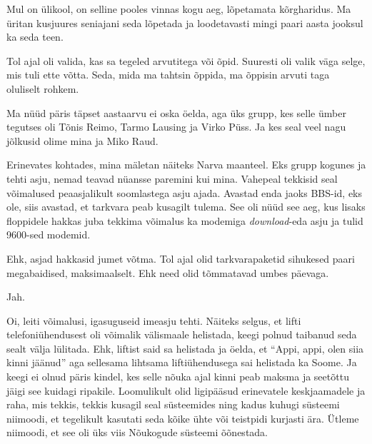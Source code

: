 
Mul on ülikool, on selline pooles vinnas kogu aeg, lõpetamata kõrgharidus. Ma 
üritan kusjuures seniajani seda lõpetada ja loodetavasti mingi paari aasta 
jooksul ka seda teen.

Tol ajal oli valida, kas sa tegeled arvutitega või õpid. Suuresti oli valik 
väga selge, mis tuli ette võtta. Seda, mida ma tahtsin õppida, ma õppisin 
arvuti taga oluliselt rohkem.
                 

Ma nüüd päris täpset aastaarvu ei oska öelda, aga üks grupp, kes selle ümber  
tegutses oli Tõnis Reimo, Tarmo 
Lausing ja Virko Püss. Ja 
kes seal  veel nagu jõlkusid olime mina ja Miko Raud.  


Erinevates kohtades, mina mäletan näiteks Narva maanteel. Eks grupp kogunes ja 
tehti asju, nemad teavad nüansse paremini kui mina. Vahepeal tekkisid seal 
võimalused  peaasjalikult soomlastega asju ajada. Avastad enda jaoks BBS-id, 
eks ole, siis avastad, et tarkvara peab kusagilt tulema. See oli nüüd see aeg, 
kus lisaks floppidele hakkas juba tekkima võimalus ka modemiga 
\emph{download}-eda asju ja  tulid 9600-sed modemid.

Ehk, asjad hakkasid jumet võtma. Tol ajal olid tarkvarapaketid sihukesed paari 
megabaidised, maksimaalselt. Ehk need olid tõmmatavad umbes päevaga.

                 
Jah. 


Oi, leiti võimalusi, igasuguseid imeasju tehti. Näiteks selgus, et lifti 
telefoniühendusest oli võimalik välismaale helistada, keegi polnud taibanud 
seda sealt välja lülitada. Ehk, liftist said sa helistada ja öelda, et 
\enquote{Appi, appi, olen siia kinni jäänud} aga sellesama lihtsama 
liftiühendusega sai helistada ka Soome. Ja keegi ei olnud päris kindel, kes 
selle nõuka ajal kinni peab maksma ja  seetõttu jäigi see kuidagi ripakile. 
Loomulikult olid ligipääsud erinevatele keskjaamadele ja raha, mis tekkis, 
tekkis kusagil seal süsteemides ning kadus kuhugi süsteemi niimoodi, et 
tegelikult kasutati seda kõike ühte või teistpidi kurjasti ära. Ütleme 
niimoodi, et see oli üks viis Nõukogude süsteemi õõnestada.

